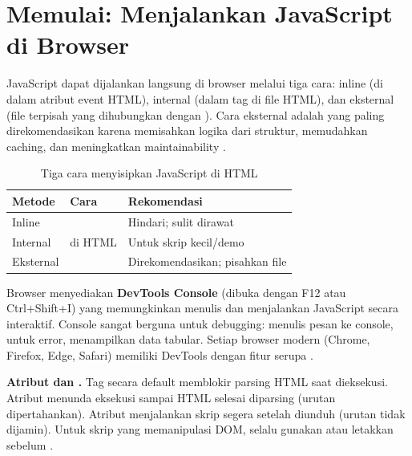 \section{Memulai: Menjalankan JavaScript di Browser}

JavaScript dapat dijalankan langsung di browser melalui tiga cara: inline (di dalam atribut event HTML), internal (dalam tag  di file HTML), dan eksternal (file  terpisah yang dihubungkan dengan ). Cara eksternal adalah yang paling direkomendasikan karena memisahkan logika dari struktur, memudahkan caching, dan meningkatkan maintainability \cite{mdnJsGuide}.

\begin{table}[htbp]
\centering
\begin{tabular}{|P{2.5cm}|P{4.5cm}|P{5cm}|}
\hline
\textbf{Metode} & \textbf{Cara} & \textbf{Rekomendasi} \\
\hline
Inline &  & Hindari; sulit dirawat \\
\hline
Internal &  di HTML & Untuk skrip kecil/demo \\
\hline
Eksternal &  & Direkomendasikan; pisahkan file \\
\hline
\end{tabular}
\caption{Tiga cara menyisipkan JavaScript di HTML}
\end{table}

Browser menyediakan \textbf{DevTools Console} (dibuka dengan F12 atau Ctrl+Shift+I) yang memungkinkan menulis dan menjalankan JavaScript secara interaktif. Console sangat berguna untuk debugging:  menulis pesan ke console,  untuk error,  menampilkan data tabular. Setiap browser modern (Chrome, Firefox, Edge, Safari) memiliki DevTools dengan fitur serupa \cite{jsInfo}.

\begin{catatan}
\textbf{Atribut  dan .} Tag  secara default memblokir parsing HTML saat dieksekusi. Atribut  menunda eksekusi sampai HTML selesai diparsing (urutan dipertahankan). Atribut  menjalankan skrip segera setelah diunduh (urutan tidak dijamin). Untuk skrip yang memanipulasi DOM, selalu gunakan  atau letakkan  sebelum  \cite{mdnJsGuide}.
\end{catatan}

